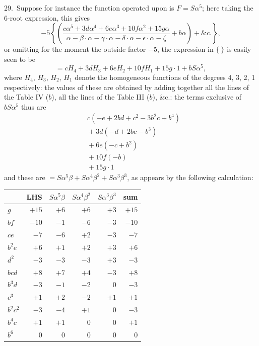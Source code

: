 \documentclass[11pt]{article}
\begin{document}
29.\ Suppose for instance the function operated upon is $F = S\alpha^5$; here taking the 6-root expression, this gives
\[
-5\left\{\!\left(\frac{c\alpha^5 + 3d\alpha^4 + 6e\alpha^3 + 10f\alpha^2 + 15g\alpha}{\alpha - \beta\cdot\alpha - \gamma\cdot\alpha - \delta\cdot\alpha - \epsilon\cdot\alpha - \zeta} + b\alpha\!\right) + \&c.\!\right\},
\]
or omitting for the moment the outside factor $-5$, the expression in $\{\ \}$ is easily seen to be
\[
= cH_4 + 3dH_3 + 6eH_2 + 10fH_1 + 15g\cdot 1 + bS\alpha^5,
\]
where $H_4$, $H_3$, $H_2$, $H_1$ denote the homogeneous functions of the degrees 4, 3, 2, 1 respectively: the values of these are obtained by adding together all the lines of the Table IV ($b$), all the lines of the Table III ($b$), \&c.: the terms exclusive of $bS\alpha^5$ thus are
\begin{align*}
& c(-e + 2bd + c^2 - 3b^2c + b^4) \\
& {} + 3d(-d + 2bc - b^3) \\
& {} + 6e(-c + b^2) \\
& {} + 10f(-b) \\
& {} + 15g\cdot 1
\end{align*}
and these are $= S\alpha^5\beta + S\alpha^4\beta^2 + S\alpha^3\beta^3$, as appears by the following calculation:

\begin{center}
\begin{tabular}{l|rrrrr}
 & LHS & $S\alpha^5\beta$ & $S\alpha^4\beta^2$ & $S\alpha^3\beta^3$ & sum \\
\hline
$g$ & $+15$ & $+6$ & $+6$ & $+3$ & $+15$ \\
$bf$ & $-10$ & $-1$ & $-6$ & $-3$ & $-10$ \\
$ce$ & $-7$ & $-6$ & $+2$ & $-3$ & $-7$ \\
$b^2e$ & $+6$ & $+1$ & $+2$ & $+3$ & $+6$ \\
$d^2$ & $-3$ & $-3$ & $-3$ & $+3$ & $-3$ \\
$bcd$ & $+8$ & $+7$ & $+4$ & $-3$ & $+8$ \\
$b^3d$ & $-3$ & $-1$ & $-2$ & $0$ & $-3$ \\
$c^3$ & $+1$ & $+2$ & $-2$ & $+1$ & $+1$ \\
$b^2c^2$ & $-3$ & $-4$ & $+1$ & $0$ & $-3$ \\
$b^4c$ & $+1$ & $+1$ & $0$ & $0$ & $+1$ \\
$b^6$ & $0$ & $0$ & $0$ & $0$ & $0$ \\
\end{tabular}
\end{center}
\end{document}
